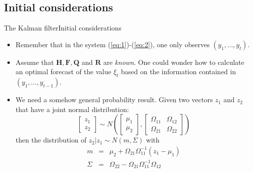 \documentclass[10pt]{beamer}
\begin{document}
\subsection{Initial considerations}
%
%
\begin{frame}{The Kalman filter}{Initial considerations}
%
%
%
\begin{itemize}
\item Remember that in the system (\ref{eq:1})-(\ref{eq:2}), one only observes $(y_{1},\ldots,y_{t})$. 
%
\item Assume that $\mathbf H, \mathbf F, \mathbf Q$ and $\mathbf R$ are \emph{known}. One could wonder how to calculate an optimal forecast of the value $\xi_{t}$ based on the information contained in $(y_{1}, \ldots, y_{t-1})$.
%
\item We need a somehow general probability result. Given two vectors $z_{1}$ and $z_{2}$ that have a joint normal distribution:
%
\begin{equation*}
%
\left[
\begin{array}{c}
z_{1}\\
z_{2}
\end{array}
\right]\sim N\left(
%
%
\left[
\begin{array}{c}
\mu_{1}\\
\mu_{2}
\end{array}
\right], 
%
\left[
\begin{array}{cc}
\Omega_{11} & \Omega_{12}\\
\Omega_{21} & \Omega_{22}
\end{array}
\right]
%
\right)
%
\end{equation*}
%
then the distribution of $z_{2}\vert z_{1}\sim N(m, \Sigma)$ with 
%
\begin{eqnarray}\label{eq:3}
m & = & \mu_{2} + \Omega_{21}\Omega^{-1}_{11}(z_{1}-\mu_{1})\\
\Sigma & = & \Omega_{22} - \Omega_{21}\Omega_{11}^{-1}\Omega_{12}\nonumber
\end{eqnarray}
%
\end{itemize}
%
\end{frame}
%
\end{document}
